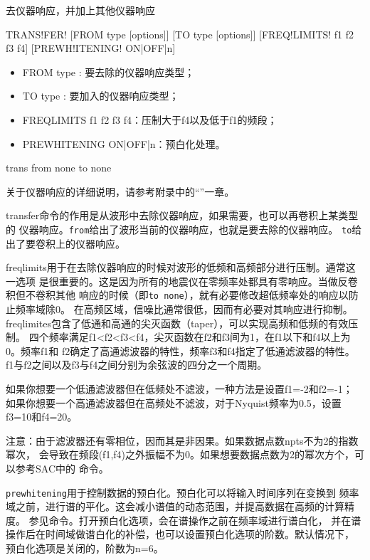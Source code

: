 \label{cmd:transfer}

去仪器响应，并加上其他仪器响应

\begin{SACSTX}
TRANS!FER! [FROM type [options]] [TO type [options]]
    [FREQ!LIMITS! f1 f2 f3 f4] [PREWH!ITENING! ON|OFF|n]
\end{SACSTX}

\begin{itemize}
\item FROM type : 要去除的仪器响应类型；
\item TO type : 要加入的仪器响应类型；
\item FREQLIMITS f1 f2 f3 f4：压制大于f4以及低于f1的频段；
\item PREWHITENING ON|OFF|n：预白化处理。
\end{itemize}

\begin{SACDFT}
trans from none to none
\end{SACDFT}

关于仪器响应的详细说明，请参考附录中的``''一章。

transfer命令的作用是从波形中去除仪器响应，如果需要，也可以再卷积上某类型的
仪器响应。\verb+from+给出了波形当前的仪器响应，也就是要去除的仪器响应。
\verb+to+给出了要卷积上的仪器响应。

freqlimits用于在去除仪器响应的时候对波形的低频和高频部分进行压制。通常这一选项
是很重要的。这是因为所有的地震仪在零频率处都具有零响应。当做反卷积但不卷积其他
响应的时候（即\verb+to none+），就有必要修改超低频率处的响应以防止频率域除0。
在高频区域，信噪比通常很低，因而有必要对其响应进行抑制。
freqlimites包含了低通和高通的尖灭函数（taper），可以实现高频和低频的有效压制。
四个频率满足f1<f2<f3<f4，尖灭函数在f2和f3间为1，在f1以下和f4以上为0。频率f1和
f2确定了高通滤波器的特性，频率f3和f4指定了低通滤波器的特性。
f1与f2之间以及f3与f4之间分别为余弦波的四分之一个周期。

如果你想要一个低通滤波器但在低频处不滤波，一种方法是设置f1=-2和f2=-1；
如果你想要一个高通滤波器但在高频处不滤波，对于Nyquist频率为0.5，设置f3=10和f4=20。

注意：由于滤波器还有零相位，因而其是非因果。如果数据点数npts不为2的指数幂次，
会导致在频段(f1,f4)之外振幅不为0。如果想要数据点数为2的幂次方个，可以参考SAC中的
命令。

\verb+prewhitening+用于控制数据的预白化。预白化可以将输入时间序列在变换到
频率域之前，进行谱的平化。这会减小谱值的动态范围，并提高数据在高频的计算精度。
参见命令。打开预白化选项，会在谱操作之前在频率域进行谱白化，
并在谱操作后在时间域做谱白化的补偿，也可以设置预白化选项的阶数。默认情况下，
预白化选项是关闭的，阶数为n=6。

